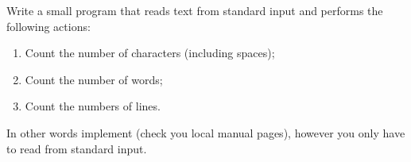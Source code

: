\begin{Exercise}[title={Word and letter count},difficulty=5]
\label{ex:wc}
\Question\label{ex:wc q1} Write a small program that reads text from
standard input and performs the following actions:
\begin{enumerate}
\item{Count the number of characters (including spaces);}
\item{Count the number of words;}
\item{Count the numbers of lines.}
\end{enumerate}
In other words implement  (check you local manual pages),
however you only have to read from standard input.
\end{Exercise}

\begin{Answer}
\Question 
\end{Answer}

